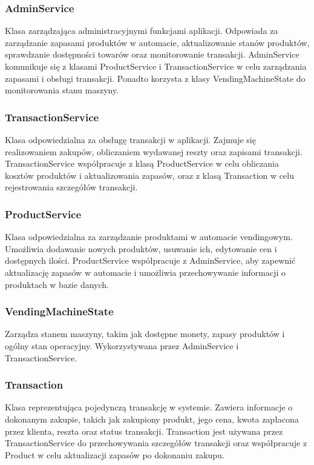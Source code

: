 \subsubsection*{AdminService}
Klasa zarządzająca administracyjnymi funkcjami aplikacji. Odpowiada za zarządzanie zapasami produktów w automacie, aktualizowanie stanów produktów, sprawdzanie dostępności towarów oraz monitorowanie transakcji. AdminService komunikuje się z klasami ProductService i TransactionService w celu zarządzania zapasami i obsługi transakcji. Ponadto korzysta z klasy VendingMachineState do monitorowania stanu maszyny.

\subsubsection*{TransactionService}
Klasa odpowiedzialna za obsługę transakcji w aplikacji. Zajmuje się realizowaniem zakupów, obliczaniem wydawanej reszty oraz zapisami transakcji. TransactionService współpracuje z klasą ProductService w celu obliczania kosztów produktów i aktualizowania zapasów, oraz z klasą Transaction w celu rejestrowania szczegółów transakcji.

\subsubsection*{ProductService}
Klasa odpowiedzialna za zarządzanie produktami w automacie vendingowym. Umożliwia dodawanie nowych produktów, usuwanie ich, edytowanie cen i dostępnych ilości. ProductService współpracuje z AdminService, aby zapewnić aktualizację zapasów w automacie i umożliwia przechowywanie informacji o produktach w bazie danych.

\subsubsection*{VendingMachineState}
Zarządza stanem maszyny, takim jak dostępne monety, zapasy produktów i ogólny stan operacyjny. Wykorzystywana przez AdminService i TransactionService.

\subsubsection*{Transaction}
Klasa reprezentująca pojedynczą transakcję w systemie. Zawiera informacje o dokonanym zakupie, takich jak zakupiony produkt, jego cena, kwota zapłacona przez klienta, reszta oraz status transakcji. Transaction jest używana przez TransactionService do przechowywania szczegółów transakcji oraz współpracuje z Product w celu aktualizacji zapasów po dokonaniu zakupu.

